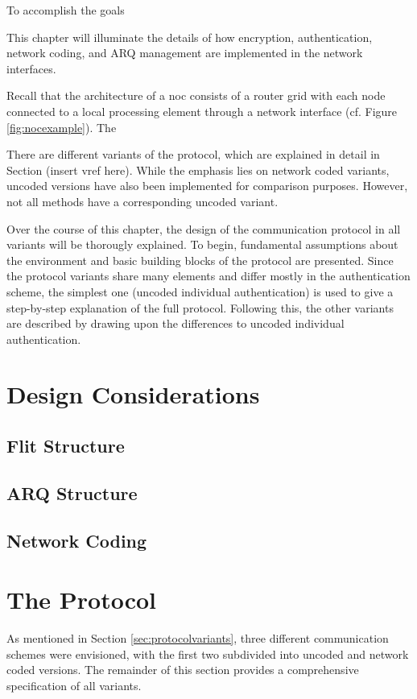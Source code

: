 To accomplish the goals 

This chapter will illuminate the details of how encryption, authentication, network coding, and ARQ management are implemented in the network
interfaces.

Recall that the architecture of a \gls{noc} consists of a router grid with each node connected to a local processing element through a network
interface (cf. Figure \vref{fig:nocexample}). The 

There are different variants of the protocol, which are explained in detail in Section (insert vref here). While the emphasis lies on network coded
variants, uncoded versions have also been implemented for comparison purposes. However, not all methods have a corresponding uncoded variant.

Over the course of this chapter, the design of the communication protocol in all variants will be thorougly explained. To begin, fundamental
assumptions about the environment and basic building blocks of the protocol are presented. Since the protocol variants share many elements and differ
mostly in the authentication scheme, the simplest one (uncoded individual authentication) is used to give a step-by-step explanation of the full
protocol. Following this, the other variants are described by drawing upon the differences to uncoded individual authentication.

\section{Design Considerations}
\subsection{Flit Structure}

\subsection{ARQ Structure}

\subsection{Network Coding}

\section{The Protocol}\label{sec:theprotocol}
As mentioned in Section \ref{sec:protocolvariants}, three different communication schemes were envisioned, with the first two subdivided into uncoded
and network coded versions. The remainder of this section provides a comprehensive specification of all variants.


